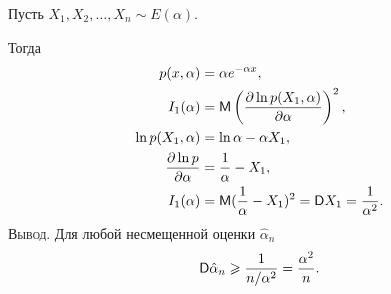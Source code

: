 \begin{ex}
	Пусть  $X_1, X_2, \dots, X_n \sim E(\alpha)$.

	Тогда
	\begin{align*}
		p(x, \alpha) &= \alpha e^{-\alpha x},\\
		I_1(\alpha) &= \mathsf M \left(\frac{\partial\ln p(X_1, \alpha)}{\partial\alpha}\right)^2,\\
		\ln p(X_1, \alpha) &= \ln \alpha - \alpha X_1,\\
		\frac{\partial \ln p}{\partial\alpha} &= \frac{1}{\alpha} - X_1,\\
		I_1(\alpha) &= \mathsf M (\frac{1}{\alpha} - X_1)^2 = \mathsf D X_1 = \dfrac{1}{\alpha^2}.
  \end{align*}
\textsc{Вывод}. Для любой несмещенной оценки $\hat\alpha_n$
\[
	\mathsf D \hat\alpha_n \geqslant \frac{1}{n/\alpha^2} = \frac{\alpha^2}{n}.
\]
\end{ex}


